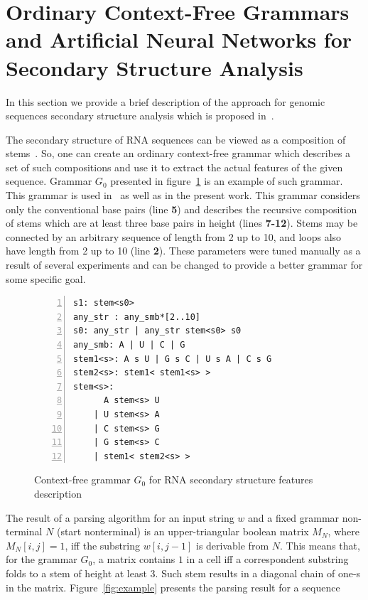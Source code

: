 \section{Ordinary Context-Free Grammars and Artificial Neural Networks for Secondary Structure Analysis}

In this section we provide a brief description of the approach for genomic sequences secondary structure analysis which is proposed in~\cite{grigorevcomposition}.

The secondary structure of RNA sequences can be viewed as a composition of stems~\cite{MQbioinformatics19}. 
So, one can create an ordinary context-free grammar which describes a set of such compositions and use it to extract the actual features of the given sequence. 
Grammar $G_0$ presented in figure~\ref{gram} is an example of such grammar.
This grammar is used in~\cite{grigorevcomposition} as well as in the present work.
This grammar considers only the conventional base pairs (line \textbf{5}) and describes the recursive composition of stems which are at least three base pairs in height (lines \textbf{7-12}).
Stems may be connected by an arbitrary sequence of length from 2 up to 10, and loops also have length from 2 up to 10 (line \textbf{2}).
These parameters were tuned manually as a result of several experiments and can be changed to provide a better grammar for some specific goal.

\begin{figure}
\begin{Verbatim}[numbers=left,xleftmargin=5mm]
s1: stem<s0>
any_str : any_smb*[2..10]
s0: any_str | any_str stem<s0> s0
any_smb: A | U | C | G
stem1<s>: A s U | G s C | U s A | C s G 
stem2<s>: stem1< stem1<s> >
stem<s>:  
      A stem<s> U 
    | U stem<s> A 
    | C stem<s> G 
    | G stem<s> C 
    | stem1< stem2<s> >  
\end{Verbatim}
\caption{Context-free grammar $G_0$ for RNA secondary structure features description}
\label{gram}
\end{figure}

The result of a parsing algorithm for an input string $w$ and a fixed grammar non-terminal $N$ (start nonterminal) is an upper-triangular boolean matrix $M_N$, where $M_N [i,j] = 1$, iff the substring $w[i,j-1]$ is derivable from $N$.
This means that, for the grammar $G_0$, a matrix contains $1$ in a cell iff a correspondent substring folds to a  stem of height at least 3.
Such stem results in a diagonal chain of one-s in the matrix.
Figure~\ref{fig:example} presents the parsing result for a sequence

